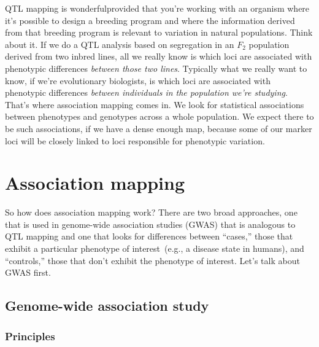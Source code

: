QTL mapping is wonderful{\dash}provided that you're working with an
organism where it's possible to design a breeding program and where
the information derived from that breeding program is relevant to
variation in natural populations. Think about it. If we do a QTL
analysis based on segregation in an $F_2$ population derived from two
inbred lines, all we really know is which loci are associated with
phenotypic differences {\it between those two lines}. Typically what
we really want to know, if we're evolutionary biologists, is which
loci are associated with phenotypic differences {\it between
  individuals in the population we're studying}. That's where
association mapping comes in. We look for statistical associations
between phenotypes and genotypes across a whole population. We expect
there to be such associations, if we have a dense enough map, because
some of our marker loci will be closely linked to loci responsible for
phenotypic variation.

\section*{Association mapping}

So how does association mapping work? There are two broad approaches,
one that is used in genome-wide association studies (GWAS) that is
analogous to QTL mapping and one that looks for differences between
``cases,'' those that exhibit a particular phenotype of
interest~(e.g., a disease state in humans), and ``controls,'' those
that don't exhibit the phenotype of interest. Let's talk about GWAS
first.

\subsection*{Genome-wide association study}

\subsubsection*{Principles}

